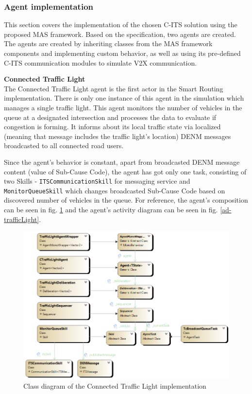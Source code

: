 \documentclass[0main.tex]{subfiles}
\begin{document}
\subsubsection{Agent implementation}\label{sec-implementation}

This section covers the implementation of the chosen C-ITS solution using the proposed 
MAS framework. Based on the specification, two agents are created. The agents are 
created by inheriting classes from the MAS framework components and implementing custom behavior, as 
well as using its pre-defined C-ITS communication modules to simulate V2X communication. 

\textbf{Connected Traffic Light} \smallskip \\
The Connected Traffic Light agent is the first actor in the Smart Routing implementation.
There is only one instance of this agent in the simulation which manages a single
traffic light. This agent monitors the number of vehicles in the queue at a designated
intersection and processes the data to evaluate if congestion is forming. It informs about its
local traffic state via localized (meaning that message includes the traffic light's location)
DENM messages broadcasted to all connected road users.

Since the agent's behavior is constant, apart from broadcasted DENM message content (value of
Sub-Cause Code), the agent has got only one task, consisting of two Skills - 
\texttt{ITSCommunicationSkill} for messaging service and \texttt{MonitorQueueSkill} which 
changes broadcasted Sub-Cause Code based on discovered number of vehicles in the queue. 
For reference, the agent's composition can be seen in fig. \ref{cd-trafficLight} and 
the agent's activity diagram can be seen in fig. \ref{ad-trafficLight}.


\begin{figure}[htbp]
    \centering
    \includegraphics[width=.9\textwidth]{cd-SmartTrafficLight.png}
    \caption{Class diagram of the Connected Traffic Light implementation}
    \label{cd-trafficLight}
\end{figure}
\end{document}
